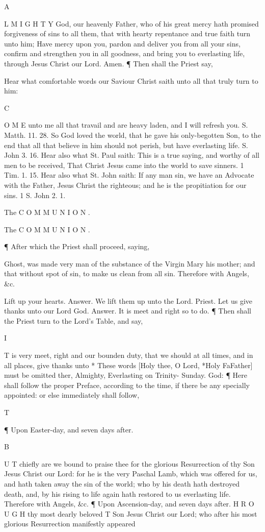 A

L M I G H T Y God, our heavenly Father, who of his great mercy hath promised forgiveness of sins to all them, that with hearty repentance and true faith turn unto him; Have mercy upon you, pardon and deliver you from all your sins, confirm and strengthen you in all goodness, and bring you to everlasting life, through Jesus Christ our Lord. Amen. ¶ Then shall the Priest say,

Hear what comfortable words our Saviour Christ saith unto all that truly turn to him:

C

O M E unto me all that travail and are heavy laden, and I will refresh you. S. Matth. 11. 28. So God loved the world, that he gave his only-begotten Son, to the end that all that believe in him should not perish, but have everlasting life. S. John 3. 16. Hear also what St. Paul saith: This is a true saying, and worthy of all men to be received, That Christ Jesus came into the world to save sinners. 1 Tim. 1. 15. Hear also what St. John saith: If any man sin, we have an Advocate with the Father, Jesus Christ the righteous; and he is the propitiation for our sins. 1 S. John 2. 1.

The C O M M U N I O N .

The C O M M U N I O N .

¶ After which the Priest shall proceed, saying,

Ghost, was made very man of the substance of the Virgin Mary his mother; and that without spot of sin, to make us clean from all sin. Therefore with Angels, \&c.

Lift up your hearts. Answer. We lift them up unto the Lord. Priest. Let us give thanks unto our Lord God. Answer. It is meet and right so to do. ¶ Then shall the Priest turn to the Lord’s Table, and say,

I

T is very meet, right and our bounden duty, that we should at all times, and in all places, give thanks unto * These words [Holy thee, O Lord, *Holy FaFather] must be omitted ther, Almighty, Everlasting on Trinity- Sunday. God: ¶ Here shall follow the proper Preface, according to the time, if there be any specially appointed: or else immediately shall follow,

T

¶ Upon Easter-day, and seven days after.

B

U T chiefly are we bound to praise thee for the glorious Resurrection of thy Son Jesus Christ our Lord: for he is the very Paschal Lamb, which was offered for us, and hath taken away the sin of the world; who by his death hath destroyed death, and, by his rising to life again hath restored to us everlasting life. Therefore with Angels, \&c. ¶ Upon Ascension-day, and seven days after. H R O U G H thy most dearly beloved T Son Jesus Christ our Lord; who after his most glorious Resurrection manifestly appeared


